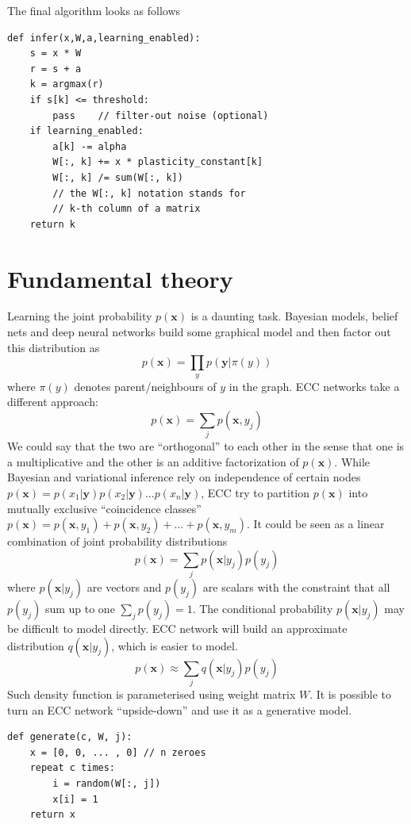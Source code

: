 \documentclass[12pt]{article}
\begin{document}
The final algorithm looks as follows
\begin{lstlisting}
def infer(x,W,a,learning_enabled):
    s = x * W
    r = s + a
    k = argmax(r)
    if s[k] <= threshold:
        pass    // filter-out noise (optional)
    if learning_enabled:
        a[k] -= alpha
        W[:, k] += x * plasticity_constant[k]
        W[:, k] /= sum(W[:, k])
        // the W[:, k] notation stands for 
        // k-th column of a matrix
    return k
\end{lstlisting}


\section{Fundamental theory}

Learning the joint probability $p(\boldsymbol{x})$ is a daunting task. Bayesian models, belief nets and deep neural networks build some graphical model and then factor out this distribution as
\[
p(\boldsymbol{x})=\prod_{y} p(\boldsymbol{y}|\pi(y))
\]
where $\pi(y)$ denotes parent/neighbours of $y$ in the graph. ECC networks take a different approach: 
\[
p(\boldsymbol{x})=\sum_{j} p(\boldsymbol{x},y_j)
\]
We could say that the two are ``orthogonal'' to each other in the sense that one is a multiplicative and the other is an additive factorization of $p(\boldsymbol{x})$.  While Bayesian and variational inference rely on independence of certain nodes $p(\boldsymbol{x})=p(x_1|\boldsymbol{y})p(x_2|\boldsymbol{y})...p(x_n|\boldsymbol{y})$, ECC try to partition $p(\boldsymbol{x})$ into mutually exclusive ``coincidence classes''
$p(\boldsymbol{x})=p(\boldsymbol{x},y_1)+p(\boldsymbol{x},y_2)+...+p(\boldsymbol{x},y_m)$. It could be seen as a linear combination of joint probability distributions
\[
p(\boldsymbol{x})=\sum_{j} p(\boldsymbol{x}|y_j) p(y_j)
\]
where $p(\boldsymbol{x}|y_j)$ are vectors and $p(y_j)$ are scalars with the constraint that all  $p(y_j)$ sum up to one $\sum_{j} p(y_j)=1$. The conditional probability $p(\boldsymbol{x}|y_j)$  may be difficult  to model directly. ECC network will build an approximate distribution $q(\boldsymbol{x}|y_j)$, which is easier to model. 
\[
p(\boldsymbol{x})\approx\sum_{j} q(\boldsymbol{x}|y_j) p(y_j)
\]
Such density function is parameterised using weight matrix $W$. It is possible to turn an ECC network ``upside-down'' and use it as a generative model.
\begin{lstlisting}
def generate(c, W, j):
    x = [0, 0, ... , 0] // n zeroes
    repeat c times:
        i = random(W[:, j])
        x[i] = 1
    return x
\end{lstlisting}
\end{document}
